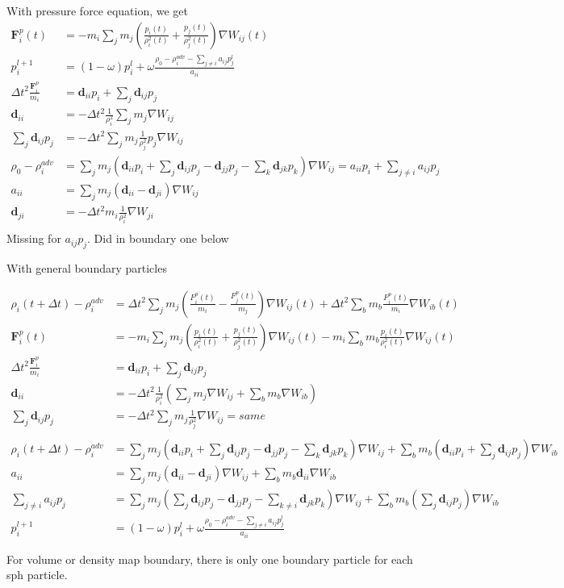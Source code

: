 \documentclass{article}
\newcommand{\FF}{\mathbf{F}}
\newcommand{\dd}{\mathbf{d}}
\begin{document}
With pressure force equation, we get 
\begin{align*}
  \FF_i^p(t) &= - m_i \sum_j m_j \left(\frac{p_i(t)}{\rho_i^2(t)} + \frac{p_j(t)}{\rho_j^2(t)} \right) \nabla W_{ij}(t) \\
  p_i^{l+1} &= (1-\omega) p_i^l + \omega \frac{ \rho_0 - \rho_i^{adv} - \sum_{j\ne i} a_{ij} p_j^l }{a_{ii}} \\
  \Delta t^2  \frac{\FF_i^p}{m_i} &= \dd_{ii} p_i + \sum_j \dd_{ij} p_j \\
  \dd_{ii} &= - \Delta t^2 \frac{1}{\rho_i^2} \sum_j m_j \nabla W_{ij} \\
  \sum_j \dd_{ij} p_j  &= - \Delta t^2 \sum_j m_j \frac{1}{\rho_j^2} p_j \nabla W_{ij} \\
  \rho_0 - \rho_i^{adv} &= \sum_j m_j ( \dd_{ii} p_i + \sum_j \dd_{ij} p_j - \dd_{jj} p_j - \sum_k \dd_{jk} p_k ) \nabla W_{ij} = a_{ii} p_i + \sum_{j\ne i} a_{ij} p_j \\
  a_{ii} &= \sum_j m_j ( \dd_{ii} - \dd_{ji} ) \nabla W_{ij} \\
  \dd_{ji}  &= - \Delta t^2 m_i \frac{1}{\rho_i^2}  \nabla W_{ji} \\
\end{align*}
Missing for $a_{ij}p_j$. Did in boundary one below

With general boundary particles

\begin{align*}
  \rho_i(t+\Delta t) - \rho_i^{adv} &= \Delta t^2 \sum_j m_j \left( \frac{F_i^p(t)}{m_i} - \frac{F_j^p(t)}{m_j} \right) \nabla W_{ij} (t) + \Delta t^2 \sum_b m_b \frac{F_i^p(t)}{m_i} \nabla W_{ib} (t) \\
  \FF_i^p(t) &= - m_i \sum_j m_j \left(\frac{p_i(t)}{\rho_i^2(t)} + \frac{p_j(t)}{\rho_j^2(t)} \right) \nabla W_{ij}(t) - m_i \sum_b m_b \frac{p_i(t)}{\rho_i^2(t)} \nabla W_{ij}(t) \\
  \Delta t^2  \frac{\FF_i^p}{m_i} &= \dd_{ii} p_i + \sum_j \dd_{ij} p_j \\
  \dd_{ii} &=  - \Delta t^2 \frac{1}{\rho_i^2} \left( \sum_j m_j \nabla W_{ij} + \sum_b m_b \nabla W_{ib} \right) \\
  \sum_j \dd_{ij} p_j  &= - \Delta t^2 \sum_j m_j \frac{1}{\rho_j^2} \nabla W_{ij} = same \\
\end{align*}
\begin{align*}
  \rho_i(t+\Delta t) - \rho_i^{adv} &= \sum_j m_j \left( \dd_{ii} p_i + \sum_j \dd_{ij} p_j  -  \dd_{jj} p_j - \sum_k \dd_{jk} p_k  \right) \nabla W_{ij} + \sum_b m_b \left( \dd_{ii} p_i + \sum_j \dd_{ij} p_j \right) \nabla W_{ib}   \\
  a_{ii} &= \sum_j m_j ( \dd_{ii} - \dd_{ji} ) \nabla W_{ij} + \sum_b m_b \dd_{ii} \nabla W_{ib} \\
  \sum_{j\ne i} a_{ij} p_j  &= \sum_j m_j \left( \sum_j \dd_{ij} p_j - \dd_{jj} p_j - \sum_{k\ne i} \dd_{jk} p_k \right) \nabla W_{ij} +  \sum_b m_b \left( \sum_j \dd_{ij} p_j \right) \nabla W_{ib}   \\
  p_i^{l+1} &= (1-\omega) p_i^l + \omega \frac{ \rho_0 - \rho_i^{adv} - \sum_{j\ne i} a_{ij} p_j^l }{a_{ii}} 
\end{align*}

For volume or density map boundary, there is only one boundary particle for each sph particle.
\end{document}
